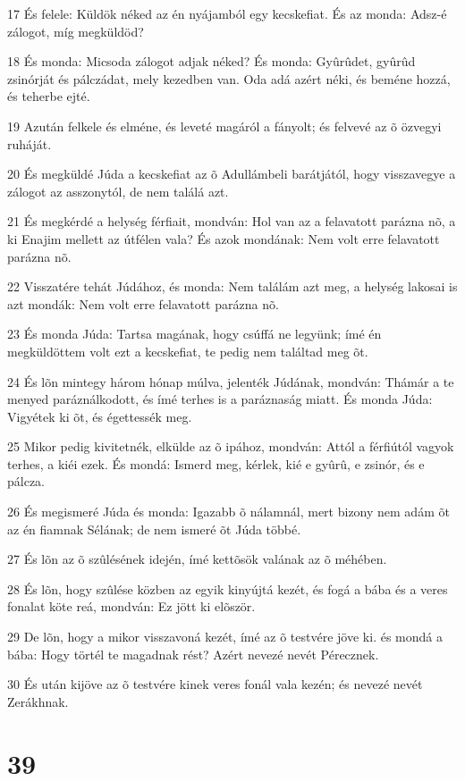 \par 17 És felele: Küldök néked az én nyájamból egy kecskefiat. És az monda: Adsz-é zálogot, míg megküldöd?
\par 18 És monda: Micsoda zálogot adjak néked? És monda: Gyûrûdet, gyûrûd zsinórját és pálczádat, mely kezedben van. Oda adá azért néki, és beméne hozzá, és teherbe ejté.
\par 19 Azután felkele és elméne, és leveté magáról a fányolt; és felvevé az õ özvegyi ruháját.
\par 20 És megküldé Júda a kecskefiat az õ Adullámbeli barátjától, hogy visszavegye a zálogot az asszonytól, de nem találá azt.
\par 21 És megkérdé a helység férfiait, mondván: Hol van az a felavatott parázna nõ, a ki Enajim mellett az útfélen vala? És azok mondának: Nem volt erre felavatott parázna nõ.
\par 22 Visszatére tehát Júdához, és monda: Nem találám azt meg, a helység lakosai is azt mondák: Nem volt erre felavatott parázna nõ.
\par 23 És monda Júda: Tartsa magának, hogy csúffá ne legyünk; ímé én megküldöttem volt ezt a kecskefiat, te pedig nem találtad meg õt.
\par 24 És lõn mintegy három hónap múlva, jelenték Júdának, mondván: Thámár a te menyed paráználkodott, és ímé terhes is a paráznaság miatt. És monda Júda: Vigyétek ki õt, és égettessék meg.
\par 25 Mikor pedig kivitetnék, elkülde az õ ipához, mondván: Attól a férfiútól vagyok terhes, a kiéi ezek. És mondá: Ismerd meg, kérlek, kié e gyûrû, e zsinór, és e pálcza.
\par 26 És megismeré Júda és monda: Igazabb õ nálamnál, mert bizony nem adám õt az én fiamnak Sélának; de nem ismeré õt Júda többé.
\par 27 És lõn az õ szûlésének idején, ímé kettõsök valának az õ méhében.
\par 28 És lõn, hogy szûlése közben az egyik kinyújtá kezét, és fogá a bába és a veres fonalat köte reá, mondván: Ez jött ki elõször.
\par 29 De lõn, hogy a mikor visszavoná kezét, ímé az õ testvére jöve ki. és mondá a bába: Hogy törtél te magadnak rést? Azért nevezé nevét Pérecznek.
\par 30 És után kijöve az õ testvére kinek veres fonál vala kezén; és nevezé nevét Zerákhnak.

\chapter{39}

